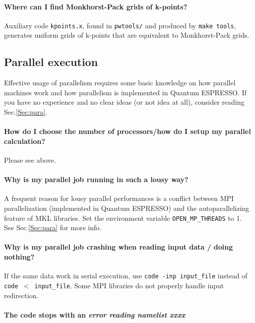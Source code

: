 \documentclass[12pt,a4paper]{article}
\def\qe{{\sc Quantum ESPRESSO}}
\begin{document}
\paragraph{Where can I find Monkhorst-Pack grids of k-points?}

Auxiliary code \texttt{kpoints.x}, found in \texttt{pwtools/} and 
produced by \texttt{make tools}, generates uniform grids of k-points 
that are equivalent to Monkhorst-Pack grids. 


\subsection{Parallel execution}

Effective usage of parallelism requires some basic knowledge on how
parallel machines work and how parallelism is implemented in
\qe. If you have no experience and no clear ideas (or not
idea at all), consider reading Sec.\ref{Sec:para}.

\paragraph{How do I choose the number of processors/how do I setup my parallel calculation?}

Please see above.

\paragraph{Why is my parallel job running in such a lousy way?}

A frequent reason for lousy parallel performances is a
conflict between MPI parallelization (implemented in \qe)
and the autoparallelizing feature of MKL libraries. Set the
environment variable \texttt{OPEN\_MP\_THREADS} to 1. 
See Sec.\ref{Sec:para} for more info.

\paragraph{Why is my parallel job crashing when reading input data / doing nothing?}

If the same data work in serial execution, use
\texttt{code -inp input\_file} instead of \texttt{code $<$ input\_file}. 
Some MPI libraries do not properly handle input redirection.

\paragraph{The code stops with an {\em error reading namelist xxxx}}
\end{document}
